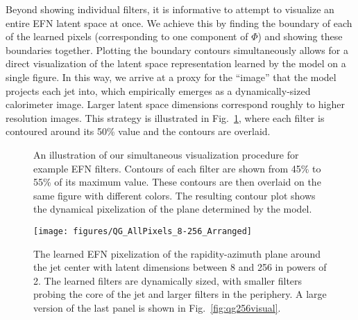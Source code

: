 \documentclass[letterpaper,11pt]{article}
\DeclareRobustCommand{\Fig}[1]{Fig.~\ref{#1}}
\begin{document}
Beyond showing individual filters, it is informative to attempt to visualize an entire EFN latent space at once.
%
We achieve this by finding the boundary of each of the learned pixels (corresponding to one component of $\Phi$) and showing these boundaries together.
%
Plotting the boundary contours simultaneously allows for a direct visualization of the latent space representation learned by the model on a single figure.
%
In this way, we arrive at a proxy for the ``image'' that the model projects each jet into, which empirically emerges as a dynamically-sized calorimeter image.
%
Larger latent space dimensions correspond roughly to higher resolution images.
%
This strategy is illustrated in \Fig{fig:visualdemo}, where each filter is contoured around its 50\% value and the contours are overlaid.


\begin{figure}[p]
\caption{
An illustration of our simultaneous visualization procedure for example EFN filters.
%
Contours of each filter are shown from 45\% to 55\% of its maximum value.
%
These contours are then overlaid on the same figure with different colors.
%
The resulting contour plot shows the dynamical pixelization of the plane determined by the model.
}
\label{fig:visualdemo}
\end{figure}


\begin{figure}[p]
\centering
\texttt{[image: figures/QG\_AllPixels\_8-256\_Arranged]}
\caption{The learned EFN pixelization of the rapidity-azimuth plane around the jet center with latent dimensions between 8 and 256 in powers of 2.
%
The learned filters are dynamically sized, with smaller filters probing the core of the jet and larger filters in the periphery.
%
A large version of the last panel is shown in \Fig{fig:qg256visual}.}
\label{fig:qgvisual}
\end{figure}
\end{document}
